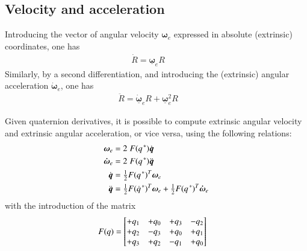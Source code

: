 \documentclass[preprint, 12pt]{elsarticle}
\def\vect#1{{\boldsymbol{#1}}}
\def\quat#1{{\boldsymbol{#1}}}
\def\conj{\hskip0.1em^*} %
\def\amatr#1{{#1}}
\newcommand{\hl}[1]{\textcolor{red}{#1}}
\begin{document}
\subsection{Velocity and acceleration} 
Introducing the vector of angular velocity $\vect{\omega}_e$ expressed in absolute (extrinsic) coordinates, one has
\begin{align}
\dot{R} = \underline{\vect{\omega}}_e R\qquad
\label{eq:Adot}
\end{align}
Similarly, by a second differentiation, and introducing the (extrinsic) angular acceleration $\vect{\dot{\omega}}_e$, one has
\begin{align}
\ddot{R}=\underline{\vect{\dot{\omega}}}_e R+\underline{\vect\omega}^2_e R\qquad
\label{eq:Adotdot}
\end{align}

Given quaternion derivatives, it is possible to compute extrinsic angular velocity and extrinsic angular acceleration, or vice versa, using the following relations:
\begin{align}
\vect{\omega}_e &= 2 \; {F}(q\conj) \dot{\quat{q}} \\
\vect{\dot{\omega}}_e &= 2 \; {F}(q\conj) \ddot{\quat{q}} \\
\dot{\quat{q}} &= \tfrac{1}{2} {F}(q\conj)^T  \vect{\omega}_e  \\
\ddot{\quat{q}} &= \tfrac{1}{2} {F}(\dot{q}\conj)^T  \vect{\omega}_e + \tfrac{1}{2} {F}(q\conj)^T  \vect{\dot{\omega}}_e 
\end{align}
with the introduction of the matrix 
\begin{align}
\label{eq:at:rotFm} 
	\amatr{F(q)}&= 
	\left[
	\begin{matrix}
	 +q_1 & +q_0  & +q_3  & -q_2  \cr
	 +q_2 & -q_3  & +q_0  & +q_1  \cr
	 +q_3 & +q_2  & -q_1  & +q_0  
	\end{matrix}
	\right]
\end{align}
\end{document}
